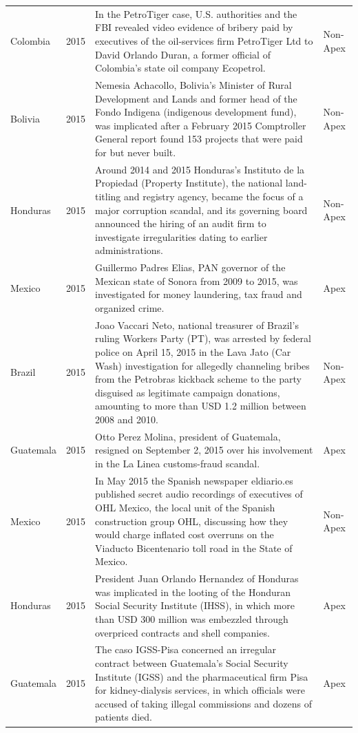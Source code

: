 \begin{landscape}
\begin{longtable}{@{}l c p{15.5cm} l@{}}
Colombia & 2015 & In the PetroTiger case, U.S. authorities and the FBI revealed video evidence of bribery paid by executives of the oil-services firm PetroTiger Ltd to David Orlando Duran, a former official of Colombia's state oil company Ecopetrol. & Non-Apex \\
Bolivia & 2015 & Nemesia Achacollo, Bolivia's Minister of Rural Development and Lands and former head of the Fondo Indigena (indigenous development fund), was implicated after a February 2015 Comptroller General report found 153 projects that were paid for but never built. & Non-Apex \\
Honduras & 2015 & Around 2014 and 2015 Honduras's Instituto de la Propiedad (Property Institute), the national land-titling and registry agency, became the focus of a major corruption scandal, and its governing board announced the hiring of an audit firm to investigate irregularities dating to earlier administrations. & Non-Apex \\
Mexico & 2015 & Guillermo Padres Elias, PAN governor of the Mexican state of Sonora from 2009 to 2015, was investigated for money laundering, tax fraud and organized crime. & Apex \\
Brazil & 2015 & Joao Vaccari Neto, national treasurer of Brazil's ruling Workers Party (PT), was arrested by federal police on April 15, 2015 in the Lava Jato (Car Wash) investigation for allegedly channeling bribes from the Petrobras kickback scheme to the party disguised as legitimate campaign donations, amounting to more than USD 1.2 million between 2008 and 2010. & Non-Apex \\
Guatemala & 2015 & Otto Perez Molina, president of Guatemala, resigned on September 2, 2015 over his involvement in the La Linea customs-fraud scandal. & Apex \\
Mexico & 2015 & In May 2015 the Spanish newspaper eldiario.es published secret audio recordings of executives of OHL Mexico, the local unit of the Spanish construction group OHL, discussing how they would charge inflated cost overruns on the Viaducto Bicentenario toll road in the State of Mexico. & Non-Apex \\
Honduras & 2015 & President Juan Orlando Hernandez of Honduras was implicated in the looting of the Honduran Social Security Institute (IHSS), in which more than USD 300 million was embezzled through overpriced contracts and shell companies. & Apex \\
Guatemala & 2015 & The caso IGSS-Pisa concerned an irregular contract between Guatemala's Social Security Institute (IGSS) and the pharmaceutical firm Pisa for kidney-dialysis services, in which officials were accused of taking illegal commissions and dozens of patients died. & Apex \\

\end{longtable}
\end{landscape}
